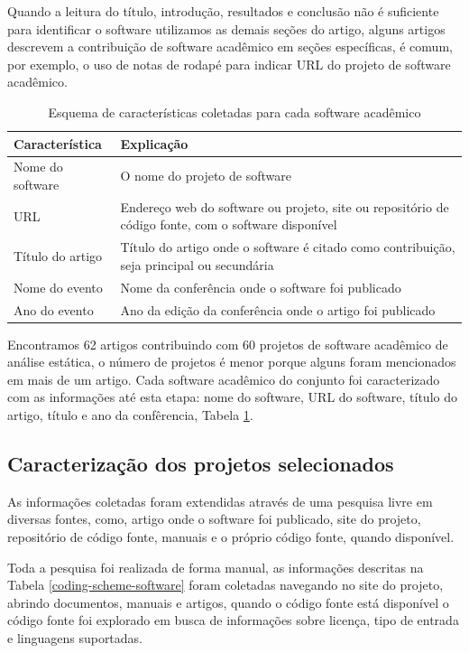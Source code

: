 Quando a leitura do título, introdução, resultados e conclusão não é suficiente
para identificar o software utilizamos as demais seções do artigo, alguns
artigos descrevem a contribuição de software acadêmico em seções específicas, é
comum, por exemplo, o uso de notas de rodapé para indicar URL do projeto de
software acadêmico.

\begin{table}[h]
\caption{Esquema de características coletadas para cada software acadêmico}
\centering
\begin{tabular}{ l p{11cm} }
  \hline
  Característica           & Explicação \\
  \hline
  Nome do software         & O nome do projeto de software \\
  URL                      & Endereço web do software ou projeto, site ou repositório de código fonte, com o software disponível \\
  Título do artigo         & Título do artigo onde o software é citado como contribuição, seja principal ou secundária \\
  Nome do evento           & Nome da conferência onde o software foi publicado \\
  Ano do evento            & Ano da edição da conferência onde o artigo foi publicado \\
  \hline
\end{tabular}
\label{coding-scheme-software-1}
\end{table}

Encontramos 62 artigos contribuindo com 60 projetos de software acadêmico de
análise estática, o número de projetos é menor porque alguns foram mencionados
em mais de um artigo. Cada software acadêmico do conjunto foi caracterizado com
as informações até esta etapa: nome do software, URL do software, título do
artigo, título e ano da confêrencia, Tabela \ref{coding-scheme-software-1}.

\subsection{Caracterização dos projetos selecionados}

As informações coletadas foram extendidas através de uma pesquisa livre em
diversas fontes, como, artigo onde o software foi publicado, site do projeto,
repositório de código fonte, manuais e o próprio código fonte, quando
disponível.

Toda a pesquisa foi realizada de forma manual, as informações descritas na
Tabela \ref{coding-scheme-software} foram coletadas navegando no site do
projeto, abrindo documentos, manuais e artigos, quando o código fonte está
disponível o código fonte foi explorado em busca de informações sobre licença,
tipo de entrada e linguagens suportadas.

